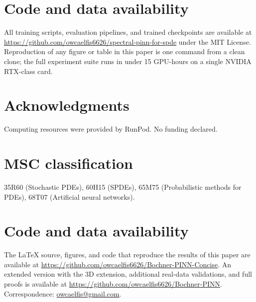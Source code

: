 \documentclass[10pt]{elsarticle}
\begin{document}
\section*{Code and data availability}

All training scripts, evaluation pipelines, and trained checkpoints
are available at
\url{https://github.com/owcaelfis6626/spectral-pinn-for-spde} under the
MIT License. Reproduction of any figure or table in this paper is
one command from a clean clone; the full experiment suite runs in
under 15 GPU-hours on a single NVIDIA RTX-class card.

\section*{Acknowledgments}

Computing resources were provided by RunPod. No funding declared.

\section*{MSC classification}

35R60 (Stochastic PDEs), 60H15 (SPDEs), 65M75 (Probabilistic
methods for PDEs), 68T07 (Artificial neural networks).


\section*{Code and data availability}
The \LaTeX{} source, figures, and code that reproduce the results of this paper are
available at \url{https://github.com/owcaelfis6626/Bochner-PINN-Concise}. An
extended version with the 3D extension, additional real-data validations, and full
proofs is available at \url{https://github.com/owcaelfis6626/Bochner-PINN}.
Correspondence: \href{mailto:owcaelfis@gmail.com}{owcaelfis@gmail.com}.



\end{document}

